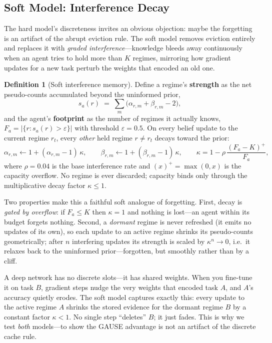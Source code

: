 \documentclass[11pt,a4paper]{article}
\theoremstyle{definition}
\newtheorem{definition}{Definition}[section]
\theoremstyle{plain}
\begin{document}
\subsection{Soft Model: Interference Decay}
\label{sec:soft_interference}

The hard model's discreteness invites an obvious objection: maybe the forgetting
is an artifact of the abrupt eviction rule. The soft model removes eviction
entirely and replaces it with \emph{graded interference}---knowledge bleeds away
continuously when an agent tries to hold more than $K$ regimes, mirroring how
gradient updates for a new task perturb the weights that encoded an old one.

\begin{definition}[Soft interference memory]
Define a regime's \textbf{strength} as the net pseudo-counts accumulated beyond
the uninformed prior,
\[
s_a(r) \;=\; \sum_{m} \bigl( \alpha_{r,m} + \beta_{r,m} - 2 \bigr),
\]
and the agent's \textbf{footprint} as the number of regimes it actually knows,
$F_a = \bigl|\{ r : s_a(r) > \varepsilon \}\bigr|$ with threshold $\varepsilon = 0.5$.
On every belief update to the current regime $r_t$, every \emph{other} held
regime $r \neq r_t$ decays toward the prior:
\[
\alpha_{r,m} \leftarrow 1 + (\alpha_{r,m} - 1)\,\kappa, \qquad
\beta_{r,m} \leftarrow 1 + (\beta_{r,m} - 1)\,\kappa,
\qquad
\kappa = 1 - \rho\,\frac{(F_a - K)^{+}}{F_a},
\]
where $\rho = 0.04$ is the base interference rate and $(x)^{+} = \max(0, x)$ is
the capacity overflow. No regime is ever discarded; capacity binds only through
the multiplicative decay factor $\kappa \le 1$.
\end{definition}

Two properties make this a faithful soft analogue of forgetting. First, decay is
\emph{gated by overflow}: if $F_a \le K$ then $\kappa = 1$ and nothing is lost---an
agent within its budget forgets nothing. Second, a \emph{dormant} regime is never
refreshed (it emits no updates of its own), so each update to an active regime
shrinks its pseudo-counts geometrically; after $n$ interfering updates its
strength is scaled by $\kappa^{n} \to 0$, i.e.\ it relaxes back to the uninformed
prior---forgotten, but smoothly rather than by a cliff.

\begin{intuition}[title={Why this is the ``neural network'' version of forgetting}]
A deep network has no discrete slots---it has shared weights. When you fine-tune
it on task $B$, gradient steps nudge the very weights that encoded task $A$, and
$A$'s accuracy quietly erodes. The soft model captures exactly this:
every update to the active regime $A$ shrinks the stored evidence for the dormant
regime $B$ by a constant factor $\kappa < 1$. No single step ``deletes'' $B$; it
just fades. This is why we test \emph{both} models---to show the GAUSE advantage
is not an artifact of the discrete cache rule.
\end{intuition}
\end{document}
